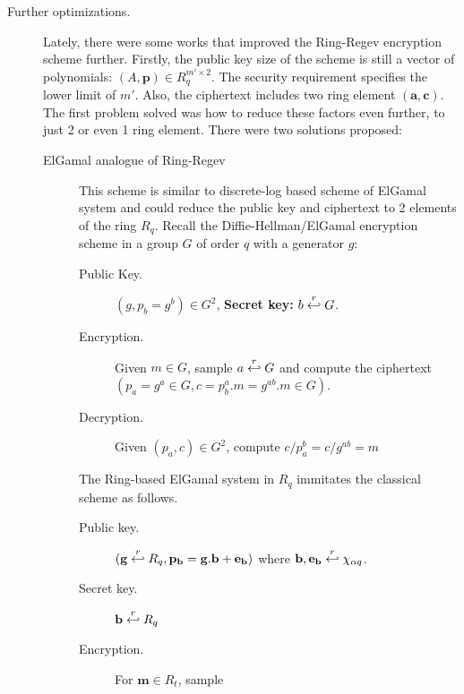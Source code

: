 \begin{description}
\begin{description}
        \item [Further optimizations.] Lately, there were some works that improved
            the Ring-Regev encryption scheme further. Firstly, the public key
            size of the scheme is still a vector of polynomials:
            $(A,\mathbf{p}) \in R_{q}^{m' \times 2}$. The security requirement
            specifies the lower limit of $m'$. Also, the ciphertext includes two
            ring element $(\mathbf{a,c})$. The first problem solved was how to
            reduce these factors even further, to just 2 or even 1 ring element. There
            were two solutions proposed:
            \begin{description}
                \item[ElGamal analogue of Ring-Regev \cite{lyubashevsky2010ideal}] This scheme
                    is similar to discrete-log based scheme of ElGamal system
                    and could reduce the public key and ciphertext to 2 elements
                    of the ring $R_q$. Recall the Diffie-Hellman/ElGamal
                    encryption scheme in a group $G$ of order $q$ with a
                    generator $g$:
                    \begin{description}
                        \item[Public Key.] $(g, p_b = g^b) \in G^2$,
                            \textbf{Secret key:} $b \stackrel{r}{\hookleftarrow} G$.
                        \item [Encryption.] Given $m \in G$, sample $a
                            \stackrel{r}{\hookleftarrow} G$ and compute the ciphertext
                            $(p_a = g^a \in G, c = p_b^a.m = g^{ab}.m \in G)$.
                        \item [Decryption.] Given $(p_a, c) \in G^2$, compute
                            $c/p_a^b = c/g^{ab} = m$
                    \end{description}
                    The Ring-based ElGamal system in $R_q$ immitates the
                    classical scheme as follows.
                    \begin{description}
                        \item[Public key.] $(\mathbf{g} \stackrel{r}{\hookleftarrow} R_q,
                            \mathbf{p_b = g.b + e_b})$ where $\mathbf{b,e_b}
                            \stackrel{r}{\hookleftarrow} \chi_{\alpha q}$.
                        \item [Secret key.] $\mathbf{b} \stackrel{r}{\hookleftarrow} R_q$
                        \item [Encryption.] For $\mathbf{m} \in R_t$, sample

\end{description}
\end{description}
\end{description}
\end{description}
